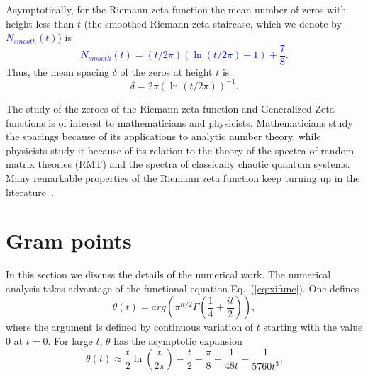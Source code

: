 \documentclass[twoside]{article}
\theoremstyle{definition}
\begin{document}
Asymptotically, for the Riemann zeta function the mean number of 
zeros with height less than $t$ (the smoothed Riemann zeta staircase, which we denote by \textcolor{blue}{
$N_{smooth}(t)$})
is~\cite{Edwards(1974)}
\textcolor{blue}{
\begin{equation}  
N_{smooth}(t) = (t/2\pi)(\ln(t/2\pi)-1)+\frac{7}{8}.
\label{eq:Rnumber}
\end{equation}
}
Thus, the mean spacing $\delta$ of the zeros at height $t$ is 
\begin{equation}  
\delta = 2\pi(\ln (t/2\pi))^{-1}. 
\label{eq:spacing}
\end{equation}

The study of the zeroes of the Riemann zeta function and Generalized 
Zeta functions is of interest to mathematicians and physicists. Mathematicians 
study the spacings because of its applications to analytic number theory, 
while physicists study it because of its  relation 
to the theory of the spectra of random matrix theories (RMT) 
and the spectra of classically chaotic quantum systems. 
Many remarkable properties of the Riemann zeta function keep turning up in the literature~\cite{os6,Matiyasevich}.

\section{\label{sec3}Gram points}

In this section we discuss the details of the numerical work. 
The numerical analysis takes advantage of the functional 
equation Eq.~(\ref{eq:xifunc}).
One defines
\begin{equation}
\theta(t) = arg (\pi^{it/2} \Gamma(\frac{1}{4} + \frac{it}{2})), 
\label{eq:theta}
\end{equation}
where the argument is defined by continuous variation of $t$ starting with the value $0$ at $t = 0$.
For large $t$, $\theta$ has the asymptotic expansion
\begin{equation}
\theta(t) \approx \frac{t}{2}\ln (\frac{t}{2\pi}) - \frac{t}{2} - \frac{\pi}{8} + \frac{1}{48t} - \frac{1}{5760t^3}. 
\label{eq:thetaAsymptotic}
\end{equation}
\end{document}
